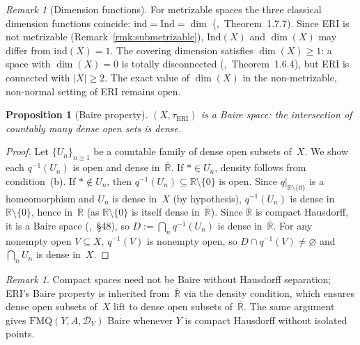 \documentclass[11pt]{article}
\newtheorem{proposition}[theorem]{Proposition}
\theoremstyle{definition}
\theoremstyle{remark}
\newtheorem{remark}[theorem]{Remark}
\begin{document}
\begin{remark}[Dimension functions]\label{rmk:dimfunctions}
For metrizable spaces the three classical dimension functions
coincide: $\mathrm{ind} = \mathrm{Ind} = \dim$
(\cite{bib:engelking},~Theorem~1.7.7).
Since ERI is not metrizable (Remark~\ref{rmk:submetrizable}),
$\mathrm{Ind}(X)$ and $\dim(X)$ may differ from
$\mathrm{ind}(X) = 1$.
The covering dimension satisfies $\dim(X) \geq 1$: a space with
$\dim(X) = 0$ is totally disconnected
(\cite{bib:engelking},~Theorem~1.6.4), but ERI is connected with
$|X| \geq 2$.
The exact value of $\dim(X)$ in the non-metrizable, non-normal
setting of ERI remains open.
\end{remark}

\begin{proposition}[Baire property]\label{prop:baire}
$(X, \tau_{\mathrm{ERI}})$ is a Baire space: the intersection of
countably many dense open sets is dense.
\end{proposition}
\begin{proof}
Let $\{U_n\}_{n \geq 1}$ be a countable family of dense open subsets
of~$X$.
We show each $q^{-1}(U_n)$ is open and dense in~$\overline{\mathbb{R}}$.
If $\ast \in U_n$, density follows from condition~(b).
If $\ast \notin U_n$, then $q^{-1}(U_n) \subseteq
\mathbb{R}\setminus\{0\}$ is open.
Since $q|_{\mathbb{R}\setminus\{0\}}$ is a homeomorphism and
$U_n$ is dense in~$X$ (by hypothesis), $q^{-1}(U_n)$ is dense in
$\mathbb{R}\setminus\{0\}$, hence in~$\overline{\mathbb{R}}$
(as $\mathbb{R}\setminus\{0\}$ is itself dense
in~$\overline{\mathbb{R}}$).
Since $\overline{\mathbb{R}}$ is compact Hausdorff, it is a Baire
space (\cite{bib:munkres},~\S48), so
$D := \bigcap_n q^{-1}(U_n)$ is dense
in~$\overline{\mathbb{R}}$.
For any nonempty open $V \subseteq X$, $q^{-1}(V)$ is nonempty
open, so $D \cap q^{-1}(V) \neq \varnothing$ and
$\bigcap_n U_n$ is dense in~$X$.
\end{proof}

\begin{remark}\label{rmk:baire-significance}
Compact spaces need not be Baire without Hausdorff separation;
ERI's Baire property is inherited from~$\overline{\mathbb{R}}$
via the density condition, which ensures dense open subsets of~$X$
lift to dense open subsets of~$\overline{\mathbb{R}}$.
The same argument gives $\mathrm{FMQ}(Y, A, \mathcal{D}_Y)$
Baire whenever $Y$ is compact Hausdorff without isolated points.
\end{remark}

\end{document}

